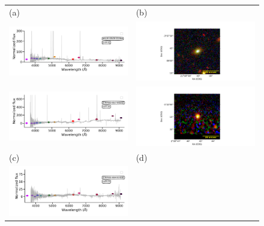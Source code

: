 \documentclass[fleqn,usenatbib]{mnras}
\begin{document}
\begin{figure}
  \setlength\tabcolsep{0pt}
  \begin{tabular}{ll}
    (a) & (b) \\
    \includegraphics[trim=10 0 10 20, clip]{Figs/spec-57313-EG220318S020919M01_sp10-173-SPLUS-s03s05-011958.pdf}
    & \includegraphics[width=0.4\linewidth, trim=10 0 10 20, clip]{Figs/SPLUS-s03s05-011958_329-3_100_r.pdf} \\
    \includegraphics[trim=10 0 10 20, clip]{Figs/spec-55893-F9304_sp15-198-STRIPE82-0057-001810.pdf}
    & \includegraphics[width=0.4\linewidth, trim=10 0 10 20, clip]{Figs/STRIPE82-0057-001810_39-1_100_r.pdf} \\
    (c) & (d) \\
    \includegraphics[trim=10 0 10 20, clip]{Figs/spec-57336-EG034838N001340M01_sp09-025-STRIPE82-0084-014280.pdf}

\end{tabular}
\end{figure}
\end{document}
